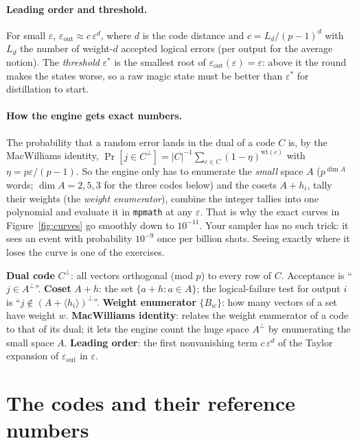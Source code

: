 \documentclass[11pt]{article}
\newcommand{\eps}{\varepsilon}
\newcommand{\code}[1]{\texttt{#1}}
\begin{document}
\paragraph{Leading order and threshold.} For small $\eps$,
$\eps_{\mathrm{out}} \approx c\,\eps^{d}$, where $d$ is the code distance and
$c = L_d/(p-1)^d$ with $L_d$ the number of weight-$d$ accepted logical errors (per
output for the average notion). The \emph{threshold} $\eps^{*}$ is the smallest root
of $\eps_{\mathrm{out}}(\eps)=\eps$: above it the round makes the states worse, so a
raw magic state must be better than $\eps^{*}$ for distillation to start.

\paragraph{How the engine gets exact numbers.} The probability that a random error
lands in the dual of a code $C$ is, by the MacWilliams identity,
$\Pr[j\in C^{\perp}] = |C|^{-1}\sum_{c\in C}(1-\eta)^{\mathrm{wt}(c)}$ with $\eta =
p\eps/(p-1)$. So the engine only has to enumerate the \emph{small} space $A$
($p^{\dim A}$ words; $\dim A = 2, 5, 3$ for the three codes below) and the cosets
$A+h_i$, tally their weights (the \emph{weight enumerator}), combine the integer
tallies into one polynomial and evaluate it in \code{mpmath} at any $\eps$. That is
why the exact curves in Figure~\ref{fig:curves} go smoothly down to $10^{-11}$. Your
sampler has no such trick: it sees an event with probability $10^{-9}$ once per
billion shots. Seeing exactly where it loses the curve is one of the exercises.

\begin{vocab}
\textbf{Dual code} $C^{\perp}$: all vectors orthogonal (mod $p$) to every row of $C$.
Acceptance is ``$j\in A^{\perp}$''.
\textbf{Coset} $A+h$: the set $\{a+h: a\in A\}$; the logical-failure test for output
$i$ is ``$j\notin (A+\langle h_i\rangle)^{\perp}$''.
\textbf{Weight enumerator} $\{B_w\}$: how many vectors of a set have weight $w$.
\textbf{MacWilliams identity}: relates the weight enumerator of a code to that of
its dual; it lets the engine count the huge space $A^{\perp}$ by enumerating the
small space $A$.
\textbf{Leading order}: the first nonvanishing term $c\,\eps^{d}$ of the Taylor
expansion of $\eps_{\mathrm{out}}$ in $\eps$.
\end{vocab}

\section{The codes and their reference numbers}
\label{sec:codes}
\end{document}
